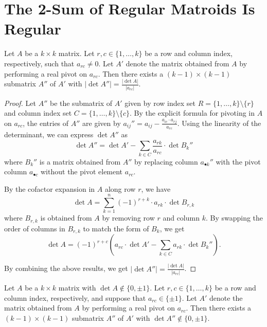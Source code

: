 \section{The 2-Sum of Regular Matroids Is Regular}

\begin{lemma}\label{lem:pivot_submatrix_det}
    Let $A$ be a $k \times k$ matrix. Let $r, c \in \{1, \dots, k\}$ be a row and column index, respectively, such that $a_{rc} \neq 0$. Let $A'$ denote the matrix obtained from $A$ by performing a real pivot on $a_{rc}$. Then there exists a $(k - 1) \times (k - 1)$ submatrix $A''$ of $A'$ with $|\det A''| = \frac{|\det A|}{|a_{rc}|}$.
\end{lemma}

\begin{proof}
    Let $A''$ be the submatrix of $A'$ given by row index set $R = \{1, \dots, k\} \setminus \{r\}$ and column index set $C = \{1, \dots, k\} \setminus \{c\}$. By the explicit formula for pivoting in $A$ on $a_{rc}$, the entries of $A''$ are given by $a_{ij}'' = a_{ij} - \frac{a_{ic} \cdot a_{rj}}{a_{rc}}$. Using the linearity of the determinant, we can express $\det A''$ as
    \[
        \det A'' = \det A' - \sum_{k \in C} \frac{a_{rk}}{a_{rc}} \cdot \det B_{k}''
    \]
    where $B_{k}''$ is a matrix obtained from $A''$ by replacing column $a_{\bullet k}''$ with the pivot column $a_{\bullet c}$ without the pivot element $a_{rc}$.

    By the cofactor expansion in $A$ along row $r$, we have
    \[
        \det A = \sum_{k = 1}^{n} (-1)^{r + k} \cdot a_{rk} \cdot \det B_{r, k}
    \]
    where $B_{r, k}$ is obtained from $A$ by removing row $r$ and column $k$. By swapping the order of columns in $B_{r, k}$ to match the form of $B_{k}$, we get
    \[
        \det A = (-1)^{r + c} (a_{rc} \cdot \det A' - \sum_{k \in C} a_{rk} \cdot \det B_{k}'').
    \]

    By combining the above results, we get $|\det A''| = \frac{|\det A|}{|a_{rc}|}$.
\end{proof}

\begin{corollary}\label{cor:pivot_submatrix_det}
    Let $A$ be a $k \times k$ matrix with $\det A \notin \{0, \pm 1\}$. Let $r, c \in \{1, \dots, k\}$ be a row and column index, respectively, and suppose that $a_{rc} \in \{\pm 1\}$. Let $A'$ denote the matrix obtained from $A$ by performing a real pivot on $a_{rc}$. Then there exists a $(k - 1) \times (k - 1)$ submatrix $A''$ of $A'$ with $\det A'' \notin \{0, \pm 1\}$.
\end{corollary}

